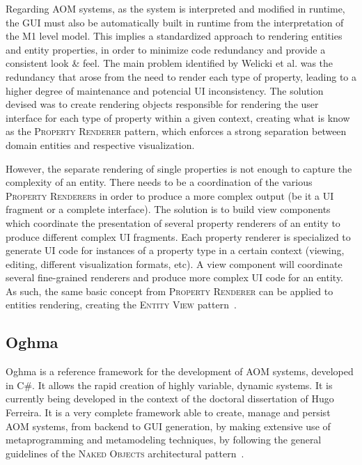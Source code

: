 Regarding AOM systems, as the system is interpreted and modified in runtime, the GUI must also be automatically built in runtime from the interpretation of the M1 level model. This implies a standardized approach to rendering entities and entity properties, in order to minimize code redundancy and provide a consistent look \& feel. The main problem identified by Welicki et al.\cite{WYW07} was the redundancy that arose from the need to render each type of property, leading to a higher degree of maintenance and potencial UI inconsistency. The solution devised was to create rendering objects responsible for rendering the user interface for each type of property within a given context, creating what is know as the \textsc{Property Renderer} pattern, which enforces a strong separation between domain entities and respective visualization.

However, the separate rendering of single properties is not enough to capture the complexity of an entity. There needs to be a coordination of the various \textsc{Property Renderers} in order to produce a more complex output (be it a UI fragment or a complete interface). The solution is to build view components which coordinate the presentation of several property renderers of an entity to produce different complex UI fragments. Each property renderer is specialized to generate UI code for instances of a property type in a certain context (viewing, editing, different visualization formats, etc). A view component will coordinate several fine-grained renderers and produce more complex UI code for an entity. As such, the same basic concept from \textsc{Property Renderer} can be applied to entities rendering, creating the \textsc{Entity View} pattern~\cite{WYW07}.

\subsection{Oghma}\label{sec:oghma}

Oghma is a reference framework for the development of AOM systems, developed in C\#. It allows the rapid creation of highly variable, dynamic systems. It is currently being developed in the context of the doctoral dissertation of Hugo Ferreira. It is a very complete framework able to create, manage and persist AOM systems, from backend to GUI generation, by making extensive use of metaprogramming and metamodeling techniques, by following the general guidelines of the \textsc{Naked Objects} architectural pattern~\cite{naked_objects}.

